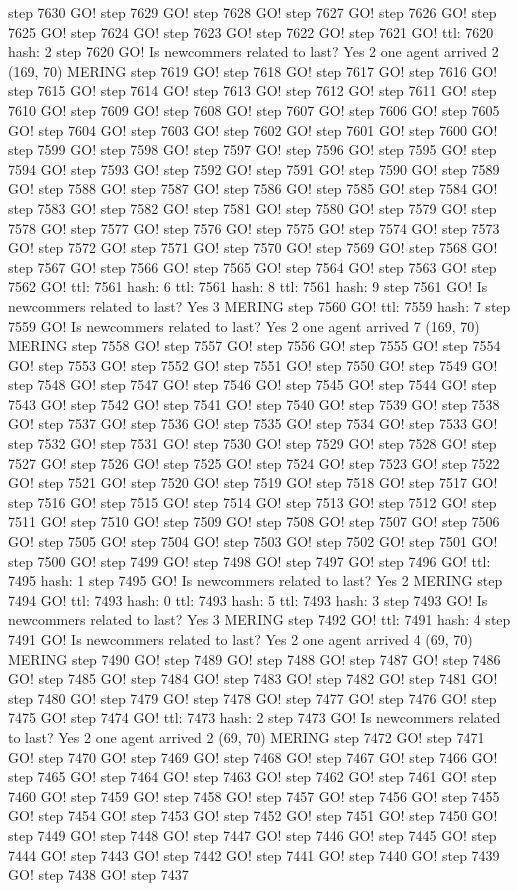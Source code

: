 step 7630 GO! step 7629 GO! step 7628 GO! step 7627 GO! step 7626 GO! step 7625 GO! step 7624 GO! step 7623 GO! step 7622 GO! step 7621 GO! ttl: 7620 hash: 2 step 7620 GO! Is newcommers related to last? Yes 2 one agent arrived 2 (169, 70) MERING step 7619 GO! step 7618 GO! step 7617 GO! step 7616 GO! step 7615 GO! step 7614 GO! step 7613 GO! step 7612 GO! step 7611 GO! step 7610 GO! step 7609 GO! step 7608 GO! step 7607 GO! step 7606 GO! step 7605 GO! step 7604 GO! step 7603 GO! step 7602 GO! step 7601 GO! step 7600 GO! step 7599 GO! step 7598 GO! step 7597 GO! step 7596 GO! step 7595 GO! step 7594 GO! step 7593 GO! step 7592 GO! step 7591 GO! step 7590 GO! step 7589 GO! step 7588 GO! step 7587 GO! step 7586 GO! step 7585 GO! step 7584 GO! step 7583 GO! step 7582 GO! step 7581 GO! step 7580 GO! step 7579 GO! step 7578 GO! step 7577 GO! step 7576 GO! step 7575 GO! step 7574 GO! step 7573 GO! step 7572 GO! step 7571 GO! step 7570 GO! step 7569 GO! step 7568 GO! step 7567 GO! step 7566 GO! step 7565 GO! step 7564 GO! step 7563 GO! step 7562 GO! ttl: 7561 hash: 6 ttl: 7561 hash: 8 ttl: 7561 hash: 9 step 7561 GO! Is newcommers related to last? Yes 3 MERING step 7560 GO! ttl: 7559 hash: 7 step 7559 GO! Is newcommers related to last? Yes 2 one agent arrived 7 (169, 70) MERING step 7558 GO! step 7557 GO! step 7556 GO! step 7555 GO! step 7554 GO! step 7553 GO! step 7552 GO! step 7551 GO! step 7550 GO! step 7549 GO! step 7548 GO! step 7547 GO! step 7546 GO! step 7545 GO! step 7544 GO! step 7543 GO! step 7542 GO! step 7541 GO! step 7540 GO! step 7539 GO! step 7538 GO! step 7537 GO! step 7536 GO! step 7535 GO! step 7534 GO! step 7533 GO! step 7532 GO! step 7531 GO! step 7530 GO! step 7529 GO! step 7528 GO! step 7527 GO! step 7526 GO! step 7525 GO! step 7524 GO! step 7523 GO! step 7522 GO! step 7521 GO! step 7520 GO! step 7519 GO! step 7518 GO! step 7517 GO! step 7516 GO! step 7515 GO! step 7514 GO! step 7513 GO! step 7512 GO! step 7511 GO! step 7510 GO! step 7509 GO! step 7508 GO! step 7507 GO! step 7506 GO! step 7505 GO! step 7504 GO! step 7503 GO! step 7502 GO! step 7501 GO! step 7500 GO! step 7499 GO! step 7498 GO! step 7497 GO! step 7496 GO! ttl: 7495 hash: 1 step 7495 GO! Is newcommers related to last? Yes 2 MERING step 7494 GO! ttl: 7493 hash: 0 ttl: 7493 hash: 5 ttl: 7493 hash: 3 step 7493 GO! Is newcommers related to last? Yes 3 MERING step 7492 GO! ttl: 7491 hash: 4 step 7491 GO! Is newcommers related to last? Yes 2 one agent arrived 4 (69, 70) MERING step 7490 GO! step 7489 GO! step 7488 GO! step 7487 GO! step 7486 GO! step 7485 GO! step 7484 GO! step 7483 GO! step 7482 GO! step 7481 GO! step 7480 GO! step 7479 GO! step 7478 GO! step 7477 GO! step 7476 GO! step 7475 GO! step 7474 GO! ttl: 7473 hash: 2 step 7473 GO! Is newcommers related to last? Yes 2 one agent arrived 2 (69, 70) MERING step 7472 GO! step 7471 GO! step 7470 GO! step 7469 GO! step 7468 GO! step 7467 GO! step 7466 GO! step 7465 GO! step 7464 GO! step 7463 GO! step 7462 GO! step 7461 GO! step 7460 GO! step 7459 GO! step 7458 GO! step 7457 GO! step 7456 GO! step 7455 GO! step 7454 GO! step 7453 GO! step 7452 GO! step 7451 GO! step 7450 GO! step 7449 GO! step 7448 GO! step 7447 GO! step 7446 GO! step 7445 GO! step 7444 GO! step 7443 GO! step 7442 GO! step 7441 GO! step 7440 GO! step 7439 GO! step 7438 GO! step 7437 